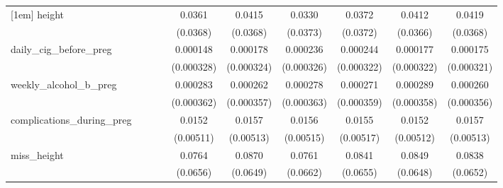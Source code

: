 \begin{table}[htbp]
\begin{tabular}{l*{9}{c}}
[1em]
height      &                     &                     &                     &      0.0361         &      0.0415         &      0.0330         &      0.0372         &      0.0412         &      0.0419         \\
            &                     &                     &                     &    (0.0368)         &    (0.0368)         &    (0.0373)         &    (0.0372)         &    (0.0366)         &    (0.0368)         \\
[1em]
daily\_cig\_before\_preg&                     &                     &                     &    0.000148         &    0.000178         &    0.000236         &    0.000244         &    0.000177         &    0.000175         \\
            &                     &                     &                     &  (0.000328)         &  (0.000324)         &  (0.000326)         &  (0.000322)         &  (0.000322)         &  (0.000321)         \\
[1em]
weekly\_alcohol\_b\_preg&                     &                     &                     &    0.000283         &    0.000262         &    0.000278         &    0.000271         &    0.000289         &    0.000260         \\
            &                     &                     &                     &  (0.000362)         &  (0.000357)         &  (0.000363)         &  (0.000359)         &  (0.000358)         &  (0.000356)         \\
[1em]
complications\_during\_preg&                     &                     &                     &      0.0152\sym{***}&      0.0157\sym{***}&      0.0156\sym{***}&      0.0155\sym{***}&      0.0152\sym{***}&      0.0157\sym{***}\\
            &                     &                     &                     &   (0.00511)         &   (0.00513)         &   (0.00515)         &   (0.00517)         &   (0.00512)         &   (0.00513)         \\
[1em]
miss\_height &                     &                     &                     &      0.0764         &      0.0870         &      0.0761         &      0.0841         &      0.0849         &      0.0838         \\
            &                     &                     &                     &    (0.0656)         &    (0.0649)         &    (0.0662)         &    (0.0655)         &    (0.0648)         &    (0.0652)         \\

\end{tabular}
\end{table}
